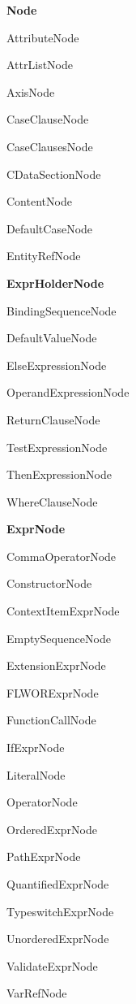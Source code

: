 \begin{description}
\item \textbf{Node}
\begin{description}
\item AttributeNode
\item AttrListNode
\item AxisNode
\item CaseClauseNode
\item CaseClausesNode
\item CDataSectionNode
\item ContentNode
\item DefaultCaseNode
\item EntityRefNode
\item \textbf{ExprHolderNode}
  \begin{description}
  \item BindingSequenceNode
  \item DefaultValueNode
  \item ElseExpressionNode
  \item OperandExpressionNode
  \item ReturnClauseNode
  \item TestExpressionNode
  \item ThenExpressionNode
  \item WhereClauseNode
  \end{description}
\item \textbf{ExprNode}
  \begin{description}
  \item CommaOperatorNode
  \item ConstructorNode
  \item ContextItemExprNode
  \item EmptySequenceNode
  \item ExtensionExprNode
  \item FLWORExprNode
  \item FunctionCallNode
  \item IfExprNode
  \item LiteralNode
  \item OperatorNode
  \item OrderedExprNode
  \item PathExprNode
  \item QuantifiedExprNode
  \item TypeswitchExprNode
  \item UnorderedExprNode
  \item ValidateExprNode
  \item VarRefNode

\end{description}
\end{description}
\end{description}
